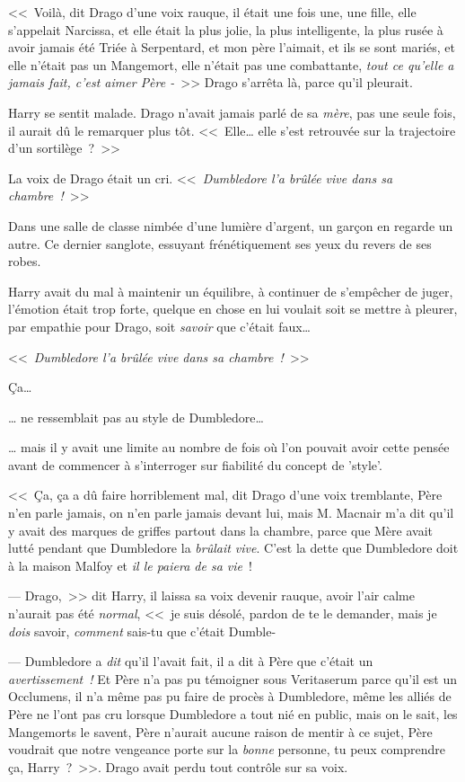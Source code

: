 <<~Voilà, dit Drago d'une voix rauque, il était une fois une, une fille, elle s'appelait Narcissa, et elle était la plus jolie, la plus intelligente, la plus rusée à avoir jamais été Triée à Serpentard, et mon père l'aimait, et ils se sont mariés, et elle n'était pas un Mangemort, elle n'était pas une combattante, \emph{tout ce qu'elle a jamais fait, c'est aimer Père -}~>> Drago s'arrêta là, parce qu'il pleurait.

Harry se sentit malade. Drago n'avait jamais parlé de sa \emph{mère}, pas une seule fois, il aurait dû le remarquer plus tôt. <<~Elle… elle s'est retrouvée sur la trajectoire d'un sortilège~?~>>

La voix de Drago était un cri. <<~\emph{Dumbledore l'a brûlée vive dans sa chambre~!}~>>

\later

Dans une salle de classe nimbée d'une lumière d'argent, un garçon en regarde un autre. Ce dernier sanglote, essuyant frénétiquement ses yeux du revers de ses robes.

Harry avait du mal à maintenir un équilibre, à continuer de s'empêcher de juger, l'émotion était trop forte, quelque en chose en lui voulait soit se mettre à pleurer, par empathie pour Drago, soit \emph{savoir} que c'était faux…

<<~\emph{Dumbledore l'a brûlée vive dans sa chambre~!}~>>

Ça…

… ne ressemblait pas au style de Dumbledore…

… mais il y avait une limite au nombre de fois où l'on pouvait avoir cette pensée avant de commencer à s'interroger sur fiabilité du concept de 'style'.

<<~Ça, ça a dû faire horriblement mal, dit Drago d'une voix tremblante, Père n'en parle jamais, on n'en parle jamais devant lui, mais M. Macnair m'a dit qu'il y avait des marques de griffes partout dans la chambre, parce que Mère avait lutté pendant que Dumbledore la \emph{brûlait vive}. C'est la dette que Dumbledore doit à la maison Malfoy et \emph{il le paiera de sa vie}~!

--- Drago,~>> dit Harry, il laissa sa voix devenir rauque, avoir l'air calme n'aurait pas été \emph{normal}, <<~je suis désolé, pardon de te le demander, mais je \emph{dois} savoir, \emph{comment} sais-tu que c'était Dumble-

--- Dumbledore a \emph{dit} qu'il l'avait fait, il a dit à Père que c'était un \emph{avertissement~!} Et Père n'a pas pu témoigner sous Veritaserum parce qu'il est un Occlumens, il n'a même pas pu faire de procès à Dumbledore, même les alliés de Père ne l'ont pas cru lorsque Dumbledore a tout nié en public, mais on le sait, les Mangemorts le savent, Père n'aurait aucune raison de mentir à ce sujet, Père voudrait que notre vengeance porte sur la \emph{bonne} personne, tu peux comprendre ça, Harry~?~>>. Drago avait perdu tout contrôle sur sa voix.

